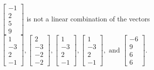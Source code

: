 \begin{exercise}
\begin{exerciseStatement}
  \end{exerciseStatement}
  \begin{exerciseAnswer}
   \(\left[\begin{array}{c}
-1 \\
2 \\
5 \\
9
\end{array}\right]\) 
  	 is not  
	a linear combination of the vectors \(\left[\begin{array}{c}
1 \\
-3 \\
2 \\
-1
\end{array}\right] , \left[\begin{array}{c}
2 \\
-3 \\
-2 \\
-2
\end{array}\right] , \left[\begin{array}{c}
1 \\
-3 \\
2 \\
-1
\end{array}\right] , \left[\begin{array}{c}
1 \\
-3 \\
2 \\
-1
\end{array}\right] , \text{ and } \left[\begin{array}{c}
-6 \\
9 \\
6 \\
6
\end{array}\right]\).

	
  


  \end{exerciseAnswer}
\end{exercise}